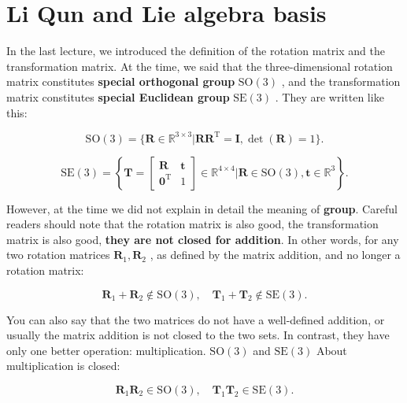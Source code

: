 \section{Li Qun and Lie algebra basis}

In the last lecture, we introduced the definition of the rotation matrix and the transformation matrix. At the time, we said that the three-dimensional rotation matrix constitutes \textbf{special orthogonal group} $ \mathrm{SO}( 3 ) $ , and the transformation matrix constitutes \textbf{special Euclidean group} $ \mathrm{SE}( 3 ) $ . They are written like this:

\begin{equation}
\mathrm{SO}(3) = \{ \bm{R} \in \mathbb{R}^{3 \times 3} | \bm{R R}^\mathrm{T} = \bm{I}, \det(\bm{R})=1 \}.
\end{equation}

\begin{equation}
\mathrm{SE}(3) = \left\{ \bm{T} = \left[ {\begin{array}{*{20}{c}}
	\bm{R} & \bm{t} \\
	{{\bm{0}^\mathrm{T}}} & 1
	\end{array}} \right]
\in \mathbb{R}^{4 \times 4} | \bm{R} \in \mathrm{SO}(3), \bm{t} \in \mathbb{R}^3\right\}.
\end{equation}

However, at the time we did not explain in detail the meaning of \textbf{group}.
Careful readers should note that the rotation matrix is also good, the transformation matrix is also good, \textbf {they are not closed for addition}.
In other words, for any two rotation matrices $ \bm {R}_ 1 , \bm {R}_ 2 $ , as defined by the matrix addition, and no longer a rotation matrix:

\begin{equation}
\bm{R}_1 + \bm{R}_2  \notin \mathrm{SO}(3), \quad \bm{T}_1 + \bm{T}_2  \notin \mathrm{SE}(3).
\end{equation}

You can also say that the two matrices do not have a well-defined addition, or usually the matrix addition is not closed to the two sets.
In contrast, they have only one better operation: multiplication. $ \mathrm {SO}( 3 ) $ and $ \mathrm {SE}( 3 ) $ About multiplication is closed:

\begin{equation}
\bm{R}_1 \bm{R}_2  \in \mathrm{SO}(3), \quad \bm{T}_1 \bm{T}_2  \in \mathrm{SE}(3).
\end{equation}

